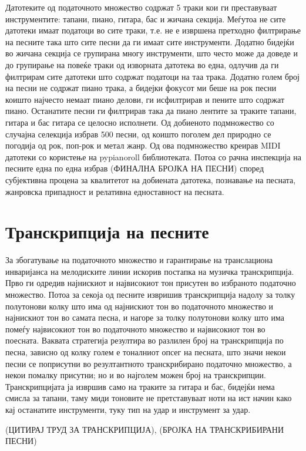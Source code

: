 Датотеките од податочното множество содржат 5 траки кои ги преставуваат инструментите: тапани, пиано, гитара, бас и жичана секција. Меѓутоа не сите датотеки имаат податоци во сите траки, т.е. не е извршена претходно филтрирање на песните така што сите песни да ги имаат сите инструменти. Додатно бидејќи во жичана секција се групирана многу инструменти, што често може да доведе и до групирање на повеќе траки од изворната датотека во една, одлучив да ги филтрирам сите датотеки што содржат податоци на таа трака. Додатно голем број на песни не содржат пиано трака, а бидејки фокусот ми беше на рок песни коишто најчесто немаат пиано делови, ги исфилтрирав и пените што содржат пиано. Останатите песни ги филтрирав така да пиано лентите за траките тапани, гитара и бас гитара се целосно исполнети. Од добиеното подмножество со случајна селекција избрав 500 песни, од коишто поголем дел природно се погодија од рок, поп-рок и метал жанр. Од ова подмножество креирав MIDI датотеки со користење на pypianoroll библиотеката. Потоа со рачна инспекција на песните една по една избрав (ФИНАЛНА БРОЈКА НА ПЕСНИ) според субјективна процена за квалитетот на добиената датотека, познавање на песната, жанровска припадност и релативна едноставност на песната.

\section{Транскрипција на песните}

За збогатување на податочното множество и гарантирање на транслациона инваријанса на мелодиските линии искорив постапка на музичка транскрипција. Прво ги одредив најнискиот и највисокиот тон присутен во избраното податочно множество. Потоа за секоја од песните извришив транскрипција надолу за толку полутонови колку што има од најнискиот тон во податочното множество и најнискиот тон во самата песна, и нагоре за толку полутонови колку што има помеѓу највисокиот тон во податочното множество и највисокиот тон во поесната. Ваквата стратегија резултира во разлилен број на транскрипција по песна, зависно од колку голем е тоналниот опсег на песната, што значи некои песни се поприсутни во резултантното транскрибирано податочно множество, а некои помалку присутни; но и во најголем можен број на транскрипции. Транскрипцијата ја извршив само на траките за гитара и бас, бидејќи нема смисла за тапани, таму миди тоновите не претставуваат ноти на ист начин како кај останатите инструменти, туку тип на удар и инструмент за удар.

(ЦИТИРАЈ ТРУД ЗА ТРАНСКРИПЦИЈА), (БРОЈКА НА ТРАНСКРИБИРАНИ ПЕСНИ)


